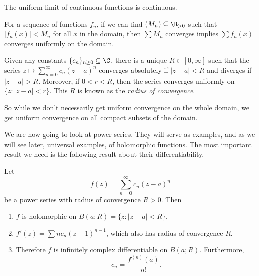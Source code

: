 \documentclass[a4paper]{article}
\begin{document}
\begin{prop}
  The uniform limit of continuous functions is continuous.
\end{prop}

\begin{prop}
  For a sequence of functions $f_n$, if we can find $(M_n) \subseteq \R_{>0}$ such that $|f_n(x)| < M_n$ for all $x$ in the domain, then $\sum M_n$ converges implies $\sum f_n(x)$ converges uniformly on the domain.
\end{prop}

\begin{prop}
  Given any constants $\{c_n\}_{n \geq 0} \subseteq \C$, there is a unique $R \in [0, \infty]$ such that the series $z \mapsto \sum_{n = 0}^\infty c_n(z - a)^n$ converges absolutely if $|z - a| < R$ and diverges if $|z - a| > R$. Moreover, if $0 < r < R$, then the series converges uniformly on $\{z: |z - a| < r\}$. This $R$ is known as the \emph{radius of convergence}.
\end{prop}
So while we don't necessarily get uniform convergence on the whole domain, we get uniform convergence on all compact subsets of the domain.

We are now going to look at power series. They will serve as examples, and as we will see later, universal examples, of holomorphic functions. The most important result we need is the following result about their differentiability.

\begin{thm}
  Let
  \[
    f(z) = \sum_{n = 0}^\infty c_n (z - a)^n
  \]
  be a power series with radius of convergence $R > 0$. Then
  \begin{enumerate}
    \item $f$ is holomorphic on $B(a; R) = \{z: |z - a| < R\}$.
    \item $f'(z) = \sum n c_n (z - 1)^{n - 1}$, which also has radius of convergence $R$.
    \item Therefore $f$ is infinitely complex differentiable on $B(a; R)$. Furthermore,
      \[
        c_n = \frac{f^{(n)}(a)}{n!}.
      \]
  \end{enumerate}
\end{thm}
\end{document}
